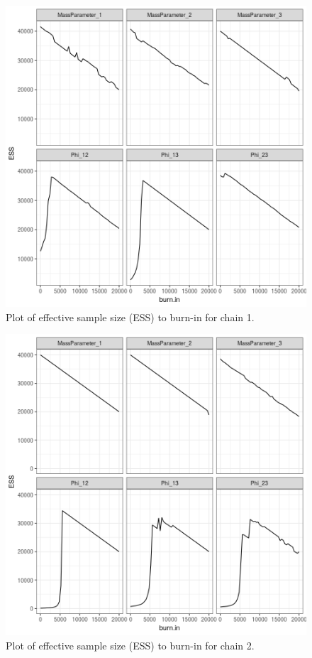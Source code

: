 \documentclass[12pt]{article} %
\begin{document}
\begin{figure}[h]
	\centering
	\includegraphics[scale=0.65]{Images/Gen_data/Case_2/Esimated_burn_in_plot_1.png}
	\caption{Plot of effective sample size (ESS) to burn-in for chain 1.}
	\label{fig:case_2_esimated_burn_in_plot_1}
\end{figure}

\newpage

\begin{figure}[h]
	\centering
	\includegraphics[scale=0.65]{Images/Gen_data/Case_2/Esimated_burn_in_plot_2.png}
	\caption{Plot of effective sample size (ESS) to burn-in for chain 2.}
	\label{fig:case_2_esimated_burn_in_plot_2}
\end{figure}
\end{document}
